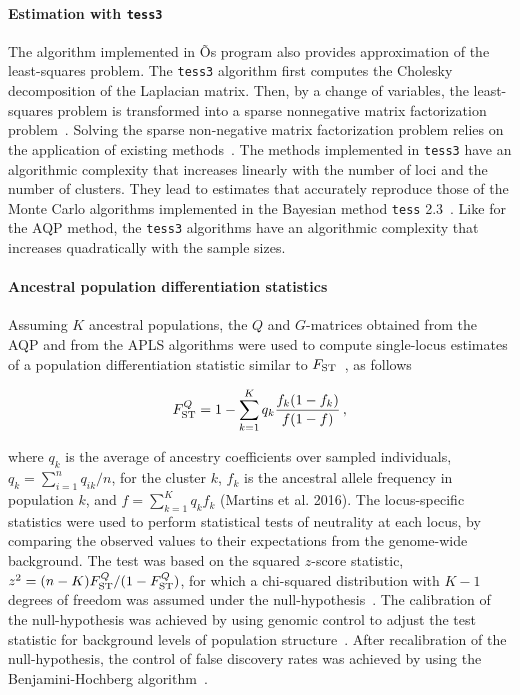 \paragraph{Estimation with {\tt tess3}}  The algorithm implemented in \cite{Caye2016}Õs  program also provides approximation of the least-squares problem. The {\tt tess3} algorithm first computes the Cholesky decomposition of the Laplacian matrix. Then, by a change of variables, the least-squares problem is transformed into a sparse nonnegative matrix factorization problem~\citep{Caye2016}.  Solving the sparse non-negative matrix factorization problem relies on the application of existing methods~\citep{Kim2011, Frichot2014}. The methods implemented in {\tt tess3} have an algorithmic complexity that increases linearly with the number of loci and the number of clusters. They lead to estimates that accurately reproduce those of the Monte Carlo algorithms implemented in the Bayesian method {\tt tess} 2.3~\citep{Caye2016}. Like for the AQP method, the {\tt tess3} algorithms have an algorithmic complexity that increases quadratically with the sample sizes. 




\paragraph{Ancestral population differentiation statistics} Assuming $K$ ancestral populations, the $Q$ and $G$-matrices  obtained from the AQP and from the APLS algorithms were used to compute single-locus estimates of a population differentiation statistic similar to $F_{\rm ST}$~\citep{Martins2016}, as follows

$$
F^{Q}_{\rm ST} = 1 - \sum_{k=1}^K  q_k \frac{f_k (1-f_k)}{f(1-f)} \, ,
$$

\noindent where $q_k$ is the average of ancestry coefficients over sampled individuals, $q_k = \sum_{i =1}^n q_{ik}/n$, for the cluster $k$, $f_k$ is the ancestral allele frequency in population $k$, and $f = \sum_{k = 1}^K q_k f_k$ (Martins et al. 2016). The locus-specific statistics were used to perform statistical tests of neutrality at each locus, by comparing the observed values to their expectations from the genome-wide background. The test was based on the squared $z$-score statistic, $z^2 = (n-K) F^{Q}_{\rm ST}/(1 - F^{Q}_{\rm ST})$, for which a  chi-squared distribution with $K-1$ degrees of freedom was assumed under the null-hypothesis~\citep{Martins2016}. The calibration of the null-hypothesis was achieved by using genomic control to adjust the test statistic for background levels of population structure~\citep{Devlin1999, Francois2016}. After recalibration of the null-hypothesis, the control of false discovery rates was achieved by using the Benjamini-Hochberg algorithm~\citep{Benjamini1995}.



